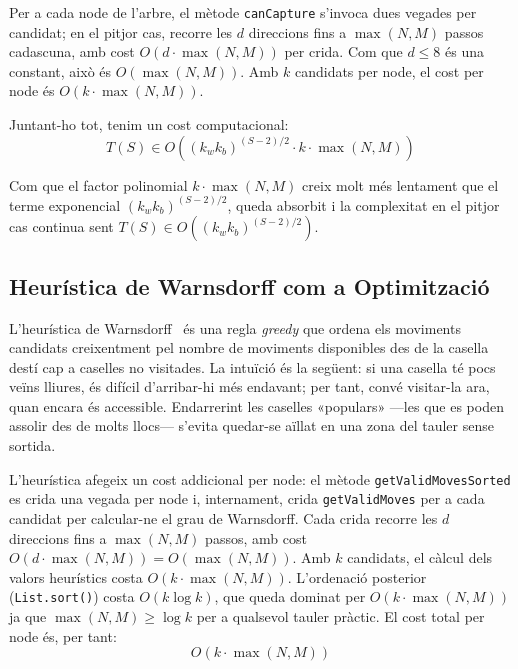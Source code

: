 \documentclass[conference,compsoc]{IEEEtran}
\begin{document}
Per a cada node de l'arbre, el mètode \texttt{canCapture} s'invoca
dues vegades per candidat; en el pitjor cas, recorre les $d$
direccions fins a $\max(N, M)$ passos cadascuna, amb cost
$O(d \cdot \max(N, M))$ per crida. Com que $d \leq 8$ és una
constant, això és $O(\max(N, M))$. Amb $k$ candidats per node,
el cost per node és $O(k \cdot \max(N, M))$.

Juntant-ho tot, tenim un cost computacional:
\[
      T(S) \in O\!\left((k_w k_b)^{(S-2)/2}
                        \cdot k \cdot \max(N, M)\right)
\]

Com que el factor polinomial $k \cdot \max(N, M)$ creix molt més
lentament que el terme exponencial $(k_w k_b)^{(S-2)/2}$, queda
absorbit i la complexitat en el pitjor cas continua sent
$T(S) \in O\!\left((k_w k_b)^{(S-2)/2}\right)$.

\subsection{Heurística de Warnsdorff com a Optimització}
\label{sec:warnsdorff}

L'heurística de Warnsdorff~\cite{ref_warnsdorff} és una regla
\textit{greedy} que ordena els moviments candidats creixentment pel
nombre de moviments disponibles des de la casella destí cap a caselles
no visitades. La intuïció és la següent: si una casella té pocs veïns
lliures, és difícil d'arribar-hi més endavant; per tant, convé
visitar-la ara, quan encara és accessible. Endarrerint les caselles
«populars» —les que es poden assolir des de molts llocs—
s'evita quedar-se aïllat en una zona del tauler sense sortida.

L'heurística afegeix un cost addicional per node: el mètode
\texttt{getValidMovesSorted} es crida una vegada per node i,
internament, crida \texttt{getValidMoves} per a cada candidat per
calcular-ne el grau de Warnsdorff.
Cada crida recorre les $d$ direccions fins a $\max(N,M)$ passos,
amb cost $O(d \cdot \max(N,M)) = O(\max(N,M))$. Amb $k$ candidats,
el càlcul dels valors heurístics costa $O(k \cdot \max(N,M))$.
L'ordenació posterior (\texttt{List.sort()}) costa $O(k \log k)$, que
queda dominat per $O(k \cdot \max(N, M))$ ja que $\max(N, M) \geq \log k$
per a qualsevol tauler pràctic. El cost total per node és, per tant:
\[
      O\!\left(k \cdot \max(N, M)\right)
\]
\end{document}
